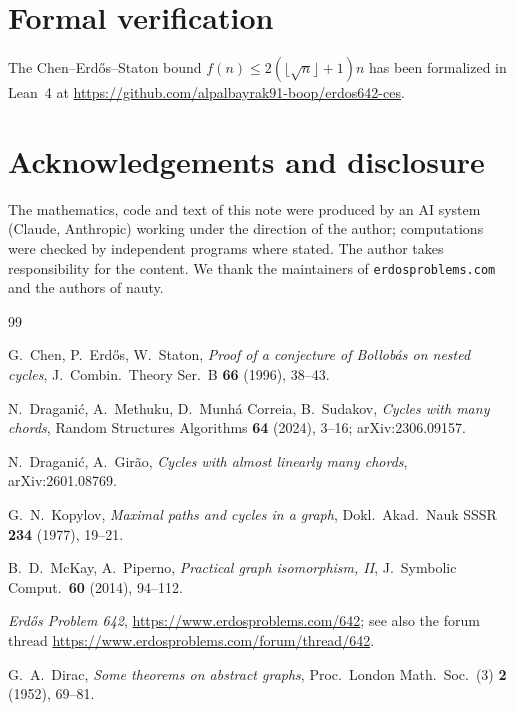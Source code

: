 \documentclass[11pt]{amsart}
\theoremstyle{remark}
\begin{document}
\section{Formal verification}

The Chen--Erd\H{o}s--Staton bound $f(n)\le 2(\lfloor\sqrt n\rfloor+1)n$ has been formalized in Lean~4 at \url{https://github.com/alpalbayrak91-boop/erdos642-ces}.

\section*{Acknowledgements and disclosure}

The mathematics, code and text of this note were produced by an AI system (Claude, Anthropic) working under the direction of the author; computations were checked by independent programs where stated. The author takes responsibility for the content. We thank the maintainers of \texttt{erdosproblems.com} and the authors of nauty.

\begin{thebibliography}{99}

 G.~Chen, P.~Erd\H{o}s, W.~Staton, \emph{Proof of a conjecture of Bollob\'as on nested cycles}, J.\ Combin.\ Theory Ser.\ B \textbf{66} (1996), 38--43.

 N.~Dragani\'c, A.~Methuku, D.~Munh\'a Correia, B.~Sudakov, \emph{Cycles with many chords}, Random Structures Algorithms \textbf{64} (2024), 3--16; arXiv:2306.09157.

 N.~Dragani\'c, A.~Gir\~ao, \emph{Cycles with almost linearly many chords}, arXiv:2601.08769.

 G.~N.~Kopylov, \emph{Maximal paths and cycles in a graph}, Dokl.\ Akad.\ Nauk SSSR \textbf{234} (1977), 19--21.

 B.~D.~McKay, A.~Piperno, \emph{Practical graph isomorphism, II}, J.\ Symbolic Comput.\ \textbf{60} (2014), 94--112.

 \emph{Erd\H{o}s Problem 642}, \url{https://www.erdosproblems.com/642}; see also the forum thread \url{https://www.erdosproblems.com/forum/thread/642}.

 G.~A.~Dirac, \emph{Some theorems on abstract graphs}, Proc.\ London Math.\ Soc.\ (3) \textbf{2} (1952), 69--81.

\end{thebibliography}
\end{document}
